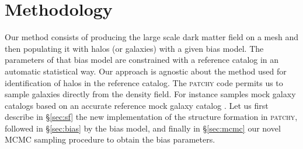 \documentclass[english,usenatbib]{mn2e}
\begin{document}
\section{Methodology}
\label{sec:method}

Our method consists of producing the large scale dark matter field on a mesh and then populating it with halos (or galaxies) with a given bias model. The parameters of that bias model are constrained with a reference catalog in an automatic statistical way. 
Our approach is agnostic about the method used for identification of halos in the reference catalog. The \textsc{patchy} code permits us to sample galaxies directly from the density field. For instance \citet{kitaura2016} samples mock galaxy catalogs based on an accurate reference mock galaxy catalog \citep{sergio2016}. 
Let us first describe in \S \ref{sec:sf} the new implementation of the structure formation in \textsc{patchy}, followed in \S \ref{sec:bias} by the bias model, and finally in  \S \ref{sec:mcmc} our novel MCMC sampling procedure to obtain the bias parameters. 
\end{document}
